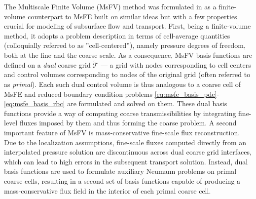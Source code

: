 The Multiscale Finite Volume (MsFV) method was formulated in \cite{Jenny2003} as a finite-volume counterpart to MsFE built on similar ideas but with a few properties crucial for modeling of subsurface flow and transport.   First, being a finite-volume method, it adopts a problem description in terms of cell-average quantities (colloquially referred to as ''cell-centered''), namely pressure degrees of freedom, both at the fine and the coarse scale.   As a consequence, MsFV basis functions are defined on a \textit{dual} coarse grid $\tilde{\mathcal{T}}$ --- a grid with nodes corresponding to cell centers and control volumes corresponding to nodes of the original grid (often referred to as \textit{primal}).   Each such dual control volume is thus analogous to a coarse cell of MsFE and reduced boundary condition problems \eqref{eq:msfe_basis_pde}-\eqref{eq:msfe_basis_rbc} are formulated and solved on them.   These dual basis functions provide a way of computing coarse transmissibilities by integrating fine-level fluxes imposed by them and thus forming the coarse problem.   A second important feature of MsFV is mass-conservative fine-scale flux reconstruction.   Due to the localization assumptions, fine-scale fluxes computed directly from an interpolated pressure solution are discontinuous across dual coarse grid interfaces, which can lead to high errors in the subsequent transport solution.   Instead, dual basis functions are used to formulate auxiliary Neumann problems on primal coarse cells, resulting in a second set of basis functions capable of producing a mass-conservative flux field in the interior of each primal coarse cell.


